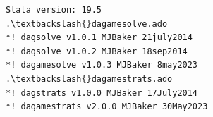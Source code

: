 \documentclass[11pt]{article}
\makeatletter
\newcommand{\boxspacing}{\kern\kvtcb@left@rule\kern\kvtcb@boxsep}
\newcommand{\prompt}[4]{
        {\ttfamily\llap{{\color{#2}[#3]:\hspace{3pt}#4}}\vspace{-\baselineskip}}
    }
\makeatother
\begin{document}
    \begin{Verbatim}[commandchars=\\\{\}]
Stata version: 19.5
.\textbackslash{}dagamesolve.ado
*! dagsolve v1.0.1 MJBaker 21july2014
*! dagsolve v1.0.2 MJBaker 18sep2014
*! dagamesolve v1.0.3 MJBaker 8may2023
.\textbackslash{}dagamestrats.ado
*! dagstrats v1.0.0 MJBaker 17July2014
*! dagamestrats v2.0.0 MJBaker 30May2023
    \end{Verbatim}

    \begin{tcolorbox}[breakable, size=fbox, boxrule=1pt, pad at break*=1mm,colback=cellbackground, colframe=cellborder]
\prompt{In}{incolor}{ }{\boxspacing}
\begin{Verbatim}[commandchars=\\\{\}]

\end{Verbatim}
\end{tcolorbox}


    
    
    
\end{document}
